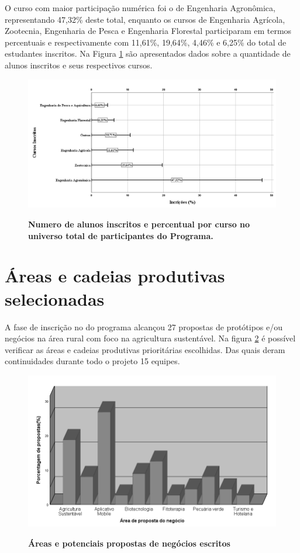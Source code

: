 O curso com maior participação numérica foi o de Engenharia Agronômica, representando 47,32\% deste total, enquanto os cursos de Engenharia Agrícola, Zootecnia, Engenharia de Pesca e Engenharia Florestal participaram em termos percentuais e respectivamente com 11,61\%, 19,64\%, 4,46\% e 6,25\% do total de estudantes inscritos. Na Figura \ref{figura_10} são apresentados dados sobre a quantidade de alunos inscritos e seus respectivos cursos.



\begin{figure}[H]
\caption{\textbf{Numero de alunos inscritos e percentual por curso no universo total de participantes do Programa.}}
\centering
\includegraphics[scale=0.3]{Imagens/inscritos.png}
\label{figura_10}
\end{figure}



\section{Áreas e cadeias produtivas selecionadas}

A fase de inscrição no do programa alcançou 27 propostas de protótipos e/ou negócios na área rural com foco na agricultura sustentável. Na figura \ref{figura_11} é possível verificar as áreas e cadeias produtivas prioritárias escolhidas. Das quais deram continuidades durante todo o projeto 15 equipes.

\begin{figure}[!htb]
\centering
\caption{\textbf{Áreas e potenciais propostas de negócios escritos}}
\includegraphics[scale=0.6]{Imagens/propostas_negocios.png}
\label{figura_11}
\end{figure}



